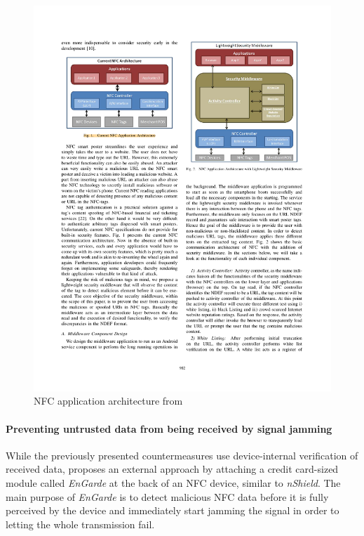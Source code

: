\documentclass[12pt,a4paper]{article}
\begin{document}
\begin{figure}
\begin{center}
\includegraphics{img/lightweight_security_middleware}
\caption{\footnotesize{NFC application architecture from \cite{DBLP:conf/trustcom/HameedHHK14}}}
\label{img_lightweight_security_middleware}
\end{center}
\end{figure}

\paragraph{Preventing untrusted data from being received by signal jamming}
While the previously presented countermeasures use device-internal verification of received data, \cite{DBLP:conf/mobisys/GummesonPGTZ13} proposes an external approach by attaching a credit card-sized module called \emph{EnGarde} at the back of an NFC device, similar to \emph{nShield}\cite{DBLP:conf/mobisys/ZhouX14}. The main purpose of \emph{EnGarde} is to detect malicious NFC data before it is fully perceived by the device and immediately start jamming the signal in order to letting the whole transmission fail. 
\end{document}
